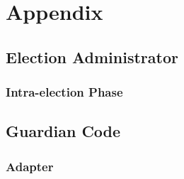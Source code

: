 \chapter{Appendix}
\section{Election Administrator}
\subsection{Intra-election Phase}

\section{Guardian Code}
\subsection{Adapter}
